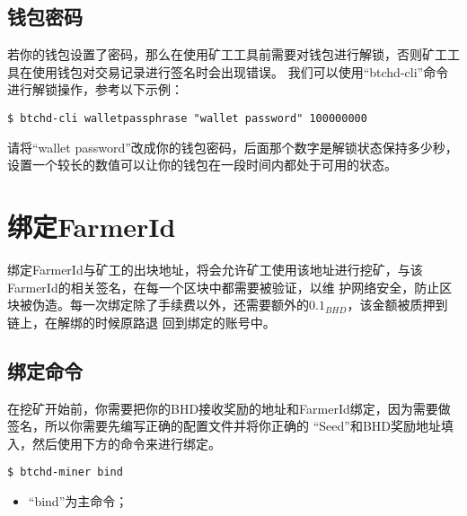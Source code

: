 \subsection{钱包密码}
\begin{flushleft}
    若你的钱包设置了密码，那么在使用矿工工具前需要对钱包进行解锁，否则矿工工具在使用钱包对交易记录进行签名时会出现错误。
    我们可以使用``btchd-cli''命令进行解锁操作，参考以下示例：
\end{flushleft}
\scriptsize
\begin{verbatim}
$ btchd-cli walletpassphrase "wallet password" 100000000
\end{verbatim}
\normalsize
\begin{flushleft}
    请将``wallet password''改成你的钱包密码，后面那个数字是解锁状态保持多少秒，
    设置一个较长的数值可以让你的钱包在一段时间内都处于可用的状态。
\end{flushleft}
\section{绑定FarmerId}
\begin{flushleft}
    绑定FarmerId与矿工的出块地址，将会允许矿工使用该地址进行挖矿，与该FarmerId的相关签名，在每一个区块中都需要被验证，以维
    护网络安全，防止区块被伪造。每一次绑定除了手续费以外，还需要额外的$0.1_{BHD}$，该金额被质押到链上，在解绑的时候原路退
    回到绑定的账号中。
\end{flushleft}
\subsection{绑定命令}
\begin{flushleft}
    在挖矿开始前，你需要把你的BHD接收奖励的地址和FarmerId绑定，因为需要做签名，所以你需要先编写正确的配置文件并将你正确的
    ``Seed''和BHD奖励地址填入，然后使用下方的命令来进行绑定。
\end{flushleft}
\scriptsize
\begin{verbatim}
$ btchd-miner bind
\end{verbatim}
\normalsize
\begin{itemize}
    \item ``bind''为主命令；
\end{itemize}
